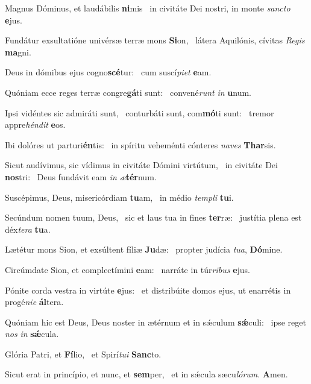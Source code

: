 \item Magnus Dóminus, et laudábilis \textbf{ni}mis~\psstar{} in civitáte Dei nostri, in monte \textit{sanc}\textit{to} \textbf{e}jus.
\item Fundátur exsultatióne univérsæ terræ mons \textbf{Si}on,~\psstar{} látera Aquilónis, cívitas \textit{Re}\textit{gis} \textbf{ma}gni.
\item Deus in dómibus ejus cogno\textbf{scé}tur:~\psstar{} cum suscí\textit{pi}\textit{et} \textbf{e}am.
\item Quóniam ecce reges terræ congre\textbf{gá}ti sunt:~\psstar{} convené\textit{runt} \textit{in} \textbf{u}num.
\item Ipsi vidéntes sic admiráti sunt,~\pscross{} conturbáti sunt, com\textbf{mó}ti sunt:~\psstar{} tremor appre\textit{hén}\textit{dit} \textbf{e}os.
\item Ibi dolóres ut parturi\textbf{én}tis:~\psstar{} in spíritu veheménti cónteres \textit{na}\textit{ves} \textbf{Thar}sis.
\item Sicut audívimus, sic vídimus in civitáte Dómini virtútum,~\pscross{} in civitáte Dei \textbf{nos}tri:~\psstar{} Deus fundávit eam \textit{in} \textit{æ}\textbf{tér}num.
\item Suscépimus, Deus, misericórdiam \textbf{tu}am,~\psstar{} in médio \textit{tem}\textit{pli} \textbf{tu}i.
\item Secúndum nomen tuum, Deus,~\pscross{} sic et laus tua in fines \textbf{ter}ræ:~\psstar{} justítia plena est déx\textit{te}\textit{ra} \textbf{tu}a.
\item Lætétur mons Sion, et exsúltent fíliæ \textbf{Ju}dæ:~\psstar{} propter judícia \textit{tu}\textit{a}, \textbf{Dó}mine.
\item Circúmdate Sion, et complectímini \textbf{e}am:~\psstar{} narráte in túr\textit{ri}\textit{bus} \textbf{e}jus.
\item Pónite corda vestra in virtúte \textbf{e}jus:~\psstar{} et distribúite domos ejus, ut enarrétis in progé\textit{ni}\textit{e} \textbf{ál}tera.
\item Quóniam hic est Deus, Deus noster in ætérnum et in sǽculum \textbf{sǽ}culi:~\psstar{} ipse reget \textit{nos} \textit{in} \textbf{sǽ}cula.
\item Glória Patri, et \textbf{Fí}lio,~\psstar{} et Spirí\textit{tu}\textit{i} \textbf{Sanc}to.
\item Sicut erat in princípio, et nunc, et \textbf{sem}per,~\psstar{} et in sǽcula sæcu\textit{ló}\textit{rum}. \textbf{A}men.
